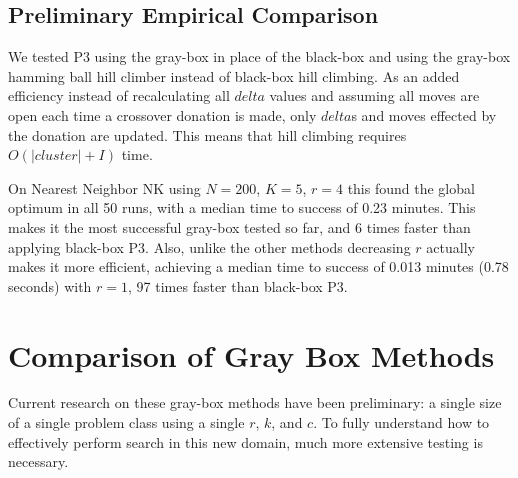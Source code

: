 \subsection{Preliminary Empirical Comparison}
We tested P3 using the gray-box  in place of the black-box 
and using the gray-box hamming ball hill climber instead of black-box hill climbing. As an added efficiency
instead of recalculating all $delta$ values and assuming all moves are open each time a crossover donation is made,
only $delta$s and moves effected by the donation are updated. This means that hill climbing requires $O(|cluster|+I)$
time.

On Nearest Neighbor NK using
$N=200$, $K=5$, $r=4$ this found the global optimum in all 50 runs, with a median time to success of 0.23 minutes. This makes it the
most successful gray-box tested so far, and 6 times faster than applying black-box P3. Also, unlike the other
methods decreasing $r$ actually makes it more efficient, achieving a median time to success of 0.013 minutes (0.78 seconds) with $r=1$,
97 times faster than black-box P3.
\section{Comparison of Gray Box Methods}

Current research on these gray-box methods have been preliminary: a single size of a single problem class using
a single $r$, $k$, and $c$. To fully understand how to effectively perform search in this new domain, much more extensive testing
is necessary.

